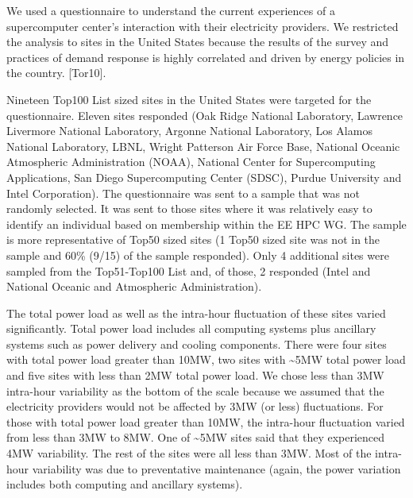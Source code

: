 We used a questionnaire to understand the current experiences of a
supercomputer center's interaction with their electricity providers. We restricted the analysis to sites in the United States
because the results of the survey and practices of demand response is highly
correlated and driven by energy policies in the country. 
\cite{torriti_demand_2010}
[Tor10].

Nineteen Top100 List sized sites in the United States were targeted for the
questionnaire. Eleven sites responded (Oak Ridge National Laboratory, 
Lawrence Livermore National Laboratory, 
Argonne National Laboratory, 
Los Alamos National Laboratory, LBNL, 
Wright Patterson Air Force Base,
National Oceanic Atmospheric Administration (NOAA), 
National Center for Supercomputing Applications, 
San Diego Supercomputing Center (SDSC), 
Purdue University and Intel Corporation). The questionnaire was
sent to a sample that was not randomly selected. It was sent to those sites
where it was relatively easy to identify an individual based on membership
within the EE HPC WG. The sample is more representative of Top50 sized sites
(1 Top50 sized site was not in the sample and 60{\%} (9/15) of the sample
responded). Only 4 additional sites were sampled from the Top51-Top100 List
and, of those, 2 responded (Intel and National Oceanic and Atmospheric Administration).

The total power load as well as the intra-hour fluctuation of these sites
varied significantly. Total power load includes all computing systems plus 
ancillary systems such as power delivery and cooling components.
There were four sites with total power load greater
than 10MW, two sites with \textasciitilde 5MW total power load and five
sites with less than 2MW total power load. We chose less than 3MW intra-hour
variability as the bottom of the scale because we assumed that the
electricity providers would not be affected by 3MW (or less) 
fluctuations. For those with total power load greater than 10MW, the
intra-hour fluctuation varied from less than 3MW to 8MW. One of
\textasciitilde 5MW sites said that they experienced 4MW variability. The
rest of the sites were all less than 3MW. Most of the intra-hour variability
was due to preventative maintenance (again, the power variation includes both computing and ancillary systems).


